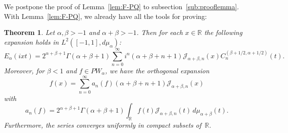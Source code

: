 \documentclass[11pt,a4paper]{amsart}
\theoremstyle{plain}
\newtheorem{Thm}{Theorem}
\theoremstyle{definition}
\newcommand{\R}{\mathbb{R}}
\newcommand{\calJ}{\mathcal{J}}
\begin{document}
We postpone the proof of Lemma~\ref{lem:F-PQ} to subsection~\ref{sub:prooflemma}. 
With Lemma~\ref{lem:F-PQ}, we already have all the tools for proving:

\begin{Thm}
\label{thm:Dunkl}
Let $\alpha,\beta > -1$ and $\alpha+\beta>-1$. Then for each $x\in \R$ the following expansion holds in
$L^{2}([-1,1],d\mu_{\alpha})$:
\begin{equation}
\label{eq:JA-Dunkl}
  E_\alpha(ixt) = 2^{\alpha+\beta+1} \Gamma(\alpha+\beta+1)
  \sum_{n = 0}^{\infty} i^{n}(\alpha+\beta+n+1)
  \calJ_{\alpha+\beta,n}(x) C_{n}^{(\beta+1/2,\alpha+1/2)}(t).
\end{equation}
Moreover, for $\beta < 1$ and $f \in PW_\alpha$, we have the orthogonal expansion
\begin{equation}
\label{eq:f-Dunkl}
  f(x) = \sum_{n=0}^\infty a_n(f) (\alpha+\beta+n+1) \calJ_{\alpha+\beta,n}(x)
\end{equation}
with
\begin{equation}
\label{eq:cnf-Dunkl}
  a_n(f) = 2^{\alpha+\beta+1} \Gamma(\alpha+\beta+1)
  \int_{\R} f(t) \calJ_{\alpha+\beta,n}(t) \,d\mu_{\alpha+\beta}(t).
\end{equation}
Furthermore, the series converges uniformly in compact subsets of~$\R$.
\end{Thm}
\end{document}
